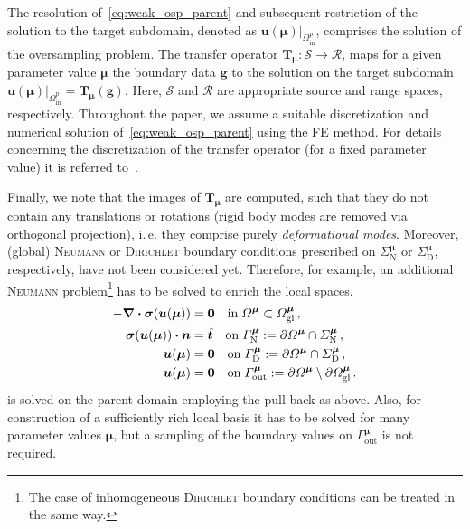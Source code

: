 \documentclass[a4paper]{eccomas_paper-2024}
\makeatletter
\newcommand{\ie}{i.\,e.\@\xspace}
\newcommand{\m}{\bm\mu}
\newcommand{\p}{\mathrm{p}}
\newcommand{\out}{\mathrm{out}}
\newcommand{\inrm}{\mathrm{in}}
\makeatother
\begin{document}
The resolution of~\cref{eq:weak_osp_parent} and subsequent restriction of the solution to the target subdomain, denoted as $\bm{u}(\m)\big\vert_{\varOmega^{\p}_{\inrm}}$, comprises the solution of the oversampling problem.
The transfer operator $\bm{T}_{\m}: \mathcal{S}\to\mathcal{R}$, maps for a given parameter value $\m$ the boundary data $\bm{g}$ to the solution on the target subdomain $\bm{u}(\m)\big\vert_{\varOmega^{\p}_{\inrm}} = \bm{T}_{\m}(\bm{g}).$
Here, $\mathcal{S}$ and $\mathcal{R}$ are appropriate source and range spaces, respectively.
Throughout the paper, we assume a suitable discretization and numerical solution of~\cref{eq:weak_osp_parent} using the FE method.
For details concerning the discretization of the transfer operator (for a fixed parameter value) it is referred to~\cite{Buhr2018Randomized}.

Finally, we note that the images of $\bm{T}_{\m}$ are computed, such that they do not contain any translations or rotations (rigid body modes are removed via orthogonal projection), \ie{} they comprise purely \textit{deformational modes}.
Moreover, (global) \textsc{Neumann} or \textsc{Dirichlet} boundary conditions prescribed on $\varSigma^{\m}_{\mathrm{N}}$ or $\varSigma^{\m}_{\mathrm{D}}$, respectively, have not been considered yet.
Therefore, for example, an additional \textsc{Neumann} problem\footnote{The case of inhomogeneous \textsc{Dirichlet} boundary conditions can be treated in the same way.} has to be solved to enrich the local spaces.
\begin{align}
	\begin{split}
	\label{eq:neumann_problem}
    - \div{\bm{\sigma}} (\bm{u}(\bm\mu)) &= \bm{0} \quad  \mathrm{in}\;{\varOmega^{\bm\mu}}\subset\varOmega^{\bm\mu}_{\mathrm{gl}}\,,\\
    \bm{\sigma}(\bm{u}(\bm\mu)) \vdot \bm{n} &= \hat{\bm{t}} \quad \mathrm{on}\; \varGamma^{\m}_{\mathrm{N}}:= \partial\varOmega^{\m}\cap\varSigma^{\m}_{\mathrm{N}}\,,\\
    \bm{u}(\bm\mu) &= \bm{0} \quad  \mathrm{on}\;\varGamma^{\m}_{\mathrm{D}}:=\partial\varOmega^{\m}\cap\varSigma^{\m}_{\mathrm{D}}\,,\\
    \bm{u}(\bm\mu) &= \bm{0}\quad\mathrm{on}\;\varGamma^{\m}_{\mathrm{out}}:= \partial\varOmega^{\m} \setminus\partial\varOmega^{\m}_{\mathrm{gl}}\,.
	\end{split}
\end{align}
 is solved on the parent domain employing the pull back as above.
Also, for construction of a sufficiently rich local basis it has to be solved for many parameter values $\m$, but a sampling of the boundary values on $\varGamma^{\m}_{\out}$ is not required.
\end{document}
